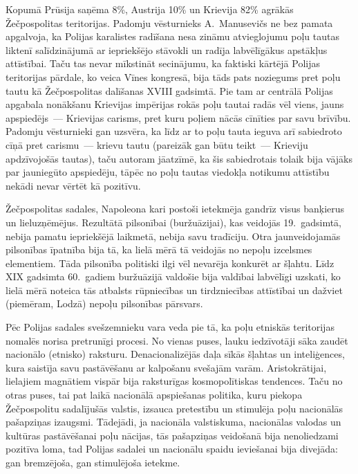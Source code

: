 \documentclass[twoside,a5paper,12pt,fleqn,openany]{extbook}
\begin{document}
Kopumā Prūsija saņēma 8\%, Austrija 10\% un Krievija 82\% agrākās Žečpospolitas teritorijas. Padomju vēsturnieks A.~Manusevičs ne bez pamata apgalvoja, ka Polijas karalistes radīšana nesa zināmu atvieglojumu poļu tautas liktenī salīdzinājumā ar iepriekšējo stāvokli un radīja labvēlīgākus apstākļus attīstībai. Taču tas nevar mīkstināt secinājumu, ka faktiski kārtējā Polijas teritorijas pārdale, ko veica Vīnes kongresā, bija tāds pats noziegums pret poļu tautu kā Žečpospolitas dalīšanas XVIII gadsimtā. Pie tam ar centrālā Polijas apgabala nonākšanu Krievijas impērijas rokās poļu tautai radās vēl viens, jauns apspiedējs~--- Krievijas carisms, pret kuru poļiem nācās cīnīties par savu brīvību. Padomju vēsturnieki gan uzsvēra, ka līdz ar to poļu tauta ieguva arī sabiedroto cīņā pret carismu~--- krievu tautu (pareizāk gan būtu teikt~--- Krieviju apdzīvojošās tautas), taču autoram jāatzīmē, ka šis sabiedrotais tolaik bija vājāks par jauniegūto apspiedēju, tāpēc no poļu tautas viedokļa notikumu attīstību nekādi nevar vērtēt kā pozitīvu.

Žečpospolitas sadales, Napoleona kari postoši ietekmēja gandrīz visus banķierus un lieluzņēmējus. Rezultātā pilsonībai (buržuāzijai), kas veidojās 19.~gadsimtā, nebija pamatu iepriekšējā laikmetā, nebija savu tradīciju. Otra jaunveidojamās pilsonības īpatnība bija tā, ka lielā mērā tā veidojās no nepoļu izcelsmes elementiem. Tāda pilsonība politiski ilgi vēl nevarēja konkurēt ar šļahtu. Līdz XIX gadsimta 60.~gadiem buržuāzijā valdošie bija valdībai labvēlīgi uzskati, ko lielā mērā noteica tās atbalsts rūpniecības un tirdzniecības attīstībai un dažviet (piemēram, Lodzā) nepoļu pilsonības pārsvars.

Pēc Polijas sadales svešzemnieku vara veda pie tā, ka poļu etniskās teritorijas nomalēs norisa pretrunīgi procesi. No vienas puses, lauku iedzīvotāji sāka zaudēt nacionālo (etnisko) raksturu. Denacionalizējās daļa sīkās šļahtas un inteliģences, kura saistīja savu pastāvēšanu ar kalpošanu svešajām varām. Aristokrātijai, lielajiem magnātiem vispār bija raksturīgas kosmopolītiskas tendences. Taču no otras puses, tai pat laikā nacionālā apspiešanas politika, kuru piekopa Žečpospolitu sadalījušās valstis, izsauca pretestību un stimulēja poļu nacionālās pašapziņas izaugsmi. Tādejādi, ja nacionāla valstiskuma, nacionālas valodas un kultūras pastāvēšanai poļu nācijas, tās pašapziņas veidošanā bija nenoliedzami pozitīva loma, tad Polijas sadalei un nacionālu spaidu ieviešanai bija divejāda: gan bremzējoša, gan stimulējoša ietekme.
\end{document}
